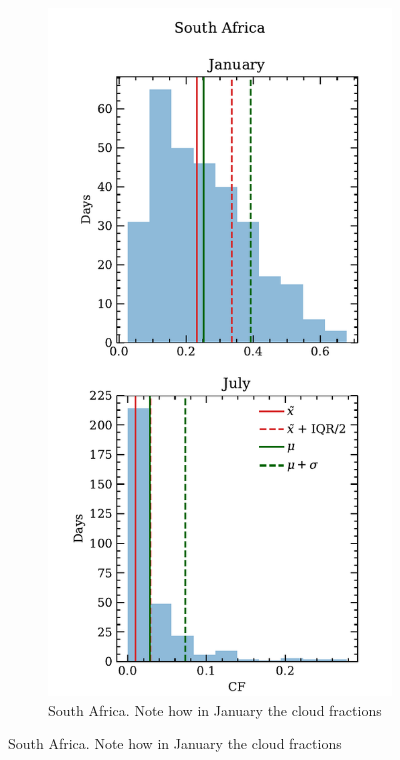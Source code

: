 \begin{figure}
  \centering
  \begin{subfigure}{0.45\textwidth}
    \centering
    \includegraphics[width=\textwidth]{figures/cf_monthly_dist_capetown}
    \caption{South Africa. Note how in January the cloud fractions
}
\end{subfigure}
\end{figure}
